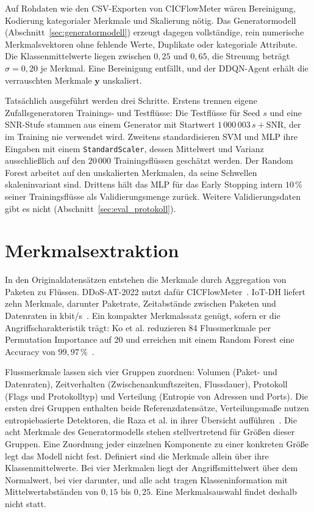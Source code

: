 Auf Rohdaten wie den CSV-Exporten von CICFlowMeter wären Bereinigung, Kodierung kategorialer Merkmale und Skalierung nötig. Das Generatormodell (Abschnitt~\ref{sec:generatormodell}) erzeugt dagegen vollständige, rein numerische Merkmalsvektoren ohne fehlende Werte, Duplikate oder kategoriale Attribute. Die Klassenmittelwerte liegen zwischen $0{,}25$ und $0{,}65$, die Streuung beträgt $\sigma=0{,}20$ je Merkmal. Eine Bereinigung entfällt, und der DDQN-Agent erhält die verrauschten Merkmale $\mathbf{y}$ unskaliert.

Tatsächlich ausgeführt werden drei Schritte. Erstens trennen eigene Zufallsgeneratoren Trainings- und Testflüsse: Die Testflüsse für Seed $s$ und eine SNR-Stufe stammen aus einem Generator mit Startwert $1\,000\,003\,s+\mathrm{SNR}$, der im Training nie verwendet wird. Zweitens standardisieren SVM und MLP ihre Eingaben mit einem \texttt{StandardScaler}, dessen Mittelwert und Varianz ausschließlich auf den $20\,000$ Trainingsflüssen geschätzt werden. Der Random Forest arbeitet auf den unskalierten Merkmalen, da seine Schwellen skaleninvariant sind. Drittens hält das MLP für das Early Stopping intern $10\,\%$ seiner Trainingsflüsse als Validierungsmenge zurück. Weitere Validierungsdaten gibt es nicht (Abschnitt~\ref{sec:eval_protokoll}).

\section{Merkmalsextraktion}
\label{sec:feature_extraktion}

In den Originaldatensätzen entstehen die Merkmale durch Aggregation von Paketen zu Flüssen. \mbox{DDoS-AT-2022} nutzt dafür CICFlowMeter~\autocite{mittalDDoSAT2022DistributedDenial2023}. \mbox{IoT-DH} liefert zehn Merkmale, darunter Paketrate, Zeitabstände zwischen Paketen und Datenraten in kbit/s~\autocite{saifIoTDHDatasetClassification2024}. Ein kompakter Merkmalssatz genügt, sofern er die Angriffscharakteristik trägt: Ko et al. reduzieren 84 Flussmerkmale per Permutation Importance auf 20 und erreichen mit einem Random Forest eine Accuracy von $99{,}97\,\%$~\autocite{koComparativeStudyAIEnabled2023}.

Flussmerkmale lassen sich vier Gruppen zuordnen: Volumen (Paket- und Datenraten), Zeitverhalten (Zwischenankunftszeiten, Flussdauer), Protokoll (Flags und Protokolltyp) und Verteilung (Entropie von Adressen und Ports). Die ersten drei Gruppen enthalten beide Referenzdatensätze, Verteilungsmaße nutzen entropiebasierte Detektoren, die Raza et al. in ihrer Übersicht aufführen~\autocite{razaFeatureSelectionBasedDDoSAttack2024}. Die acht Merkmale des Generatormodells stehen stellvertretend für Größen dieser Gruppen. Eine Zuordnung jeder einzelnen Komponente zu einer konkreten Größe legt das Modell nicht fest. Definiert sind die Merkmale allein über ihre Klassenmittelwerte. Bei vier Merkmalen liegt der Angriffsmittelwert über dem Normalwert, bei vier darunter, und alle acht tragen Klasseninformation mit Mittelwertabständen von $0{,}15$ bis $0{,}25$. Eine Merkmalsauswahl findet deshalb nicht statt.

